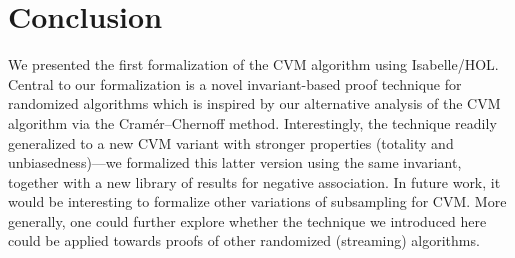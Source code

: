 \section{Conclusion}\label{sec:conclusion}
We presented the first formalization of the CVM algorithm using Isabelle/HOL.
Central to our formalization is a novel invariant-based proof technique for randomized algorithms which is inspired by our alternative analysis of the CVM algorithm via the Cram\'{e}r--Chernoff method.
Interestingly, the technique readily generalized to a new CVM variant with stronger properties (totality and unbiasedness)---we formalized this latter version using the same invariant, together with a new library of results for negative association.
In future work, it would be interesting to formalize other variations of subsampling for CVM.
More generally, one could further explore whether the technique we introduced here could be applied towards proofs of other randomized (streaming) algorithms.
